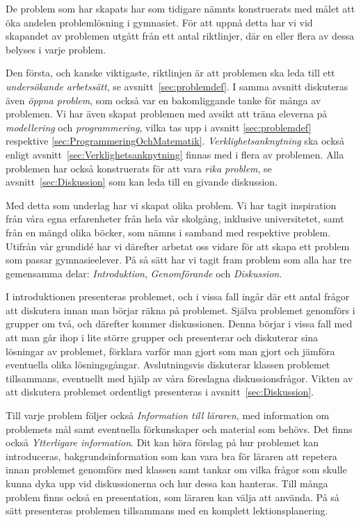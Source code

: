 \textcolor{lila}{De problem som har skapats har som tidigare nämnts konstruerats med målet att öka andelen problemlösning i gymnasiet. För att uppnå detta har vi vid skapandet av problemen utgått från ett antal riktlinjer, där en eller flera av dessa belyses i varje problem.}

\textcolor{lila}{Den första, och kanske viktigaste, riktlinjen är att problemen ska leda till ett \textsl{undersökande arbetssätt}, se avsnitt~\ref{sec:problemdef}. I samma avsnitt diskuteras även \textsl{öppna problem}, som också var en bakomliggande tanke för många av problemen. Vi har även skapat problemen med avsikt att träna eleverna på \textsl{modellering} och \textsl{programmering}, vilka tas upp i avsnitt \ref{sec:problemdef} respektive \ref{sec:ProgrammeringOchMatematik}. \textsl{Verklighetsanknytning} ska också enligt avsnitt~\ref{sec:Verklighetsanknytning} finnas med i flera av problemen. Alla problemen har också konstruerats för att vara \textsl{rika problem}, se avsnitt~\ref{sec:Diskussion} som kan leda till en givande diskussion.}

\textcolor{lila}{Med detta som underlag har vi skapat olika problem. Vi har tagit inspiration från våra egna erfarenheter från hela vår skolgång, inklusive universitetet, samt från en mängd olika böcker, som nämns i samband med respektive problem. Utifrån vår grundidé har vi därefter arbetat oss vidare för att skapa ett problem som passar gymnasieelever. På så sätt har vi tagit fram problem som alla har tre gemensamma delar: \textsl{Introduktion}, \textsl{Genomförande} och \textsl{Diskussion}.}

\textcolor{lila}{I introduktionen presenteras problemet, och i vissa fall ingår där ett antal frågor att diskutera innan man börjar räkna på problemet. Själva problemet genomförs i grupper om två, och därefter kommer diskussionen. Denna börjar i vissa fall med att man går ihop i lite större grupper och presenterar och diskuterar sina lösningar av problemet, förklara varför man gjort som man gjort och jämföra eventuella olika lösningsgångar. Avslutningsvis diskuterar klassen problemet tillsammans, eventuellt med hjälp av våra föreslagna diskussionsfrågor. Vikten av att diskutera  problemet ordentligt presenteras i avsnitt~\ref{sec:Diskussion}.} 

\textcolor{lila}{Till varje problem följer också \textsl{Information till läraren}, med information om problemets mål samt eventuella förkunskaper och material som behövs. Det finns också \textsl{Ytterligare information}. Dit kan höra förslag på hur problemet kan introduceras, bakgrundsinformation som kan vara bra för läraren att repetera innan problemet genomförs med klassen samt tankar om vilka frågor som skulle kunna dyka upp vid diskussionerna och hur dessa kan hanteras. Till många problem finns också en presentation, som läraren kan välja att använda. På så sätt presenteras problemen tillsammans med en komplett lektionsplanering.}


